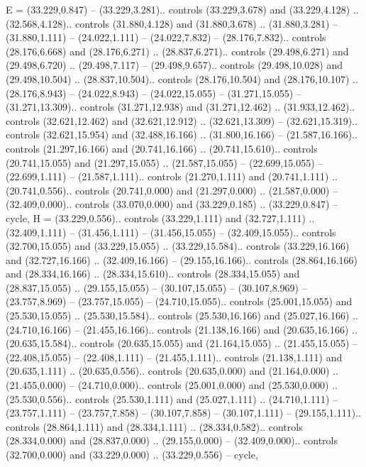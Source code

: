 {E} = {(33.229,0.847) -- (33.229,3.281).. controls (33.229,3.678) and (33.229,4.128) .. (32.568,4.128).. controls (31.880,4.128) and (31.880,3.678) .. (31.880,3.281) -- (31.880,1.111) -- (24.022,1.111) -- (24.022,7.832) -- (28.176,7.832).. controls (28.176,6.668) and (28.176,6.271) .. (28.837,6.271).. controls (29.498,6.271) and (29.498,6.720) .. (29.498,7.117) -- (29.498,9.657).. controls (29.498,10.028) and (29.498,10.504) .. (28.837,10.504).. controls (28.176,10.504) and (28.176,10.107) .. (28.176,8.943) -- (24.022,8.943) -- (24.022,15.055) -- (31.271,15.055) -- (31.271,13.309).. controls (31.271,12.938) and (31.271,12.462) .. (31.933,12.462).. controls (32.621,12.462) and (32.621,12.912) .. (32.621,13.309) -- (32.621,15.319).. controls (32.621,15.954) and (32.488,16.166) .. (31.800,16.166) -- (21.587,16.166).. controls (21.297,16.166) and (20.741,16.166) .. (20.741,15.610).. controls (20.741,15.055) and (21.297,15.055) .. (21.587,15.055) -- (22.699,15.055) -- (22.699,1.111) -- (21.587,1.111).. controls (21.270,1.111) and (20.741,1.111) .. (20.741,0.556).. controls (20.741,0.000) and (21.297,0.000) .. (21.587,0.000) -- (32.409,0.000).. controls (33.070,0.000) and (33.229,0.185) .. (33.229,0.847) -- cycle},
{H} = {(33.229,0.556).. controls (33.229,1.111) and (32.727,1.111) .. (32.409,1.111) -- (31.456,1.111) -- (31.456,15.055) -- (32.409,15.055).. controls (32.700,15.055) and (33.229,15.055) .. (33.229,15.584).. controls (33.229,16.166) and (32.727,16.166) .. (32.409,16.166) -- (29.155,16.166).. controls (28.864,16.166) and (28.334,16.166) .. (28.334,15.610).. controls (28.334,15.055) and (28.837,15.055) .. (29.155,15.055) -- (30.107,15.055) -- (30.107,8.969) -- (23.757,8.969) -- (23.757,15.055) -- (24.710,15.055).. controls (25.001,15.055) and (25.530,15.055) .. (25.530,15.584).. controls (25.530,16.166) and (25.027,16.166) .. (24.710,16.166) -- (21.455,16.166).. controls (21.138,16.166) and (20.635,16.166) .. (20.635,15.584).. controls (20.635,15.055) and (21.164,15.055) .. (21.455,15.055) -- (22.408,15.055) -- (22.408,1.111) -- (21.455,1.111).. controls (21.138,1.111) and (20.635,1.111) .. (20.635,0.556).. controls (20.635,0.000) and (21.164,0.000) .. (21.455,0.000) -- (24.710,0.000).. controls (25.001,0.000) and (25.530,0.000) .. (25.530,0.556).. controls (25.530,1.111) and (25.027,1.111) .. (24.710,1.111) -- (23.757,1.111) -- (23.757,7.858) -- (30.107,7.858) -- (30.107,1.111) -- (29.155,1.111).. controls (28.864,1.111) and (28.334,1.111) .. (28.334,0.582).. controls (28.334,0.000) and (28.837,0.000) .. (29.155,0.000) -- (32.409,0.000).. controls (32.700,0.000) and (33.229,0.000) .. (33.229,0.556) -- cycle},
